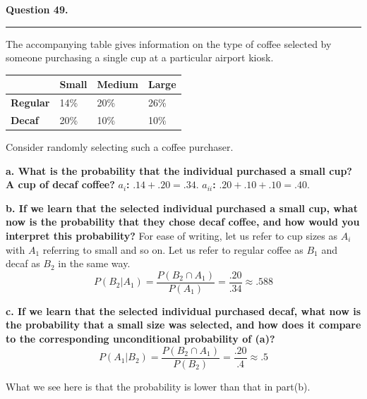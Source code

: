 \textbf{Question 49.} \\
\hrule 

The accompanying table gives information on the type of coffee selected by someone purchasing a single cup at a particular airport kiosk.

\begin{table}[h]
\begin{tabular}{llll}
\hline
 & \textbf{Small} & \textbf{Medium} & \textbf{Large} \\ \hline
\textbf{Regular} & 14\% & 20\% & 26\% \\
\textbf{Decaf} & 20\% & 10\% & 10\%
\end{tabular}
\end{table}

Consider randomly selecting such a coffee purchaser.

\textbf{a. What is the probability that the individual purchased a small cup? A cup of decaf coffee?} \newline 
\textbf{$a_i$:} $.14+.20 = \boxed{.34}$. \textbf{$a_{ii}$:} $.20+.10+.10 = \boxed{.40}$.

\textbf{b. If we learn that the selected individual purchased a small cup, what now is the probability that they chose decaf coffee, and how would you interpret this probability?} \newline 
For ease of writing, let us refer to cup sizes as $A_i$ with $A_1$ referring to small and so on. Let us refer to regular coffee as $B_1$ and decaf as $B_2$ in the same way.
\[P(B_2 | A_1) = \frac{P(B_2 \cap A_1)}{P(A_1)} = \frac{.20}{.34} \approx \boxed{.588}\]

\textbf{c. If we learn that the selected individual purchased decaf, what now is the probability that a small size was selected, and how does it compare to the corresponding unconditional probability of (a)?}
\[P(A_1 | B_2) = \frac{P(B_2 \cap A_1)}{P(B_2)} = \frac{.20}{.4} \approx \boxed{.5}\]

What we see here is that the probability is lower than that in part(b). 